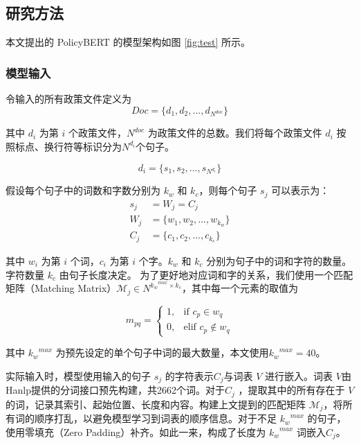 \documentclass[12pt, a4paper]{ctexart}
\begin{document}
\subsection{研究方法}

本文提出的 PolicyBERT 的模型架构如图 \ref{fig:test} 所示。

\subsubsection{模型输入}
令输入的所有政策文件定义为 
\begin{equation}
    Doc = \{d_1, d_2, \dots, d_{N^{doc}}\} 
\end{equation}

其中 $d_i$ 为第 $i$ 个政策文件，${N^{doc}}$ 为政策文件的总数。我们将每个政策文件 $d_i$ 按照标点、换行符等标识分为$N^{d_i}$个句子。 

\begin{equation}
   d_i = \{s_1, s_2, \dots, s_{N^{d_i}}\} 
\end{equation}

假设每个句子中的词数和字数分别为 $k_w$ 和 $k_c$，则每个句子 $s_j$ 可以表示为：
\begin{equation}
    \begin{split}
        s_j &= W_j = C_j \\
        W_j &= \{w_1, w_2, \dots, w_{k_w}\} \\
        C_j &= \{c_1, c_2, \dots, c_{k_c}\}
    \end{split}
\end{equation}

其中 $w_i$ 为第 $i$ 个词，$c_i$ 为第 $i$ 个字。$k_w$ 和 $k_c$ 分别为句子中的词和字符的数量。字符数量 $k_c$ 由句子长度决定。
为了更好地对应词和字的关系，我们使用一个匹配矩阵（Matching Matrix）${\mathcal{M}}_j  \in N^{{k_w}^{max} \times k_c}$，其中每一个元素的取值为

\begin{equation}
    m_{pq} = \begin{cases}
        1, & \text{if } c_p \in w_q \\
        0, & \text{elif } c_p \notin w_q
    \end{cases}
\end{equation}

其中 ${k_w}^{max}$ 为预先设定的单个句子中词的最大数量，本文使用${k_w}^{max}=40$。

实际输入时，模型使用输入的句子 $s_j$ 的字符表示$C_j$与词表 $V$ 进行嵌入。词表 $V$由Hanlp提供的分词接口预先构建，共2662个词。对于$C_j$ ，提取其中的所有存在于 $V$ 的词，记录其索引、起始位置、长度和内容。构建上文提到的匹配矩阵 ${\mathcal{M}}_j$，将所有词的顺序打乱，以避免模型学习到词表的顺序信息。对于不足 ${k_w}^{max}$ 的句子，使用零填充（Zero Padding）补齐。如此一来，构成了长度为 ${k_w}^{max}$ 词嵌入$C_j$。
\end{document}
